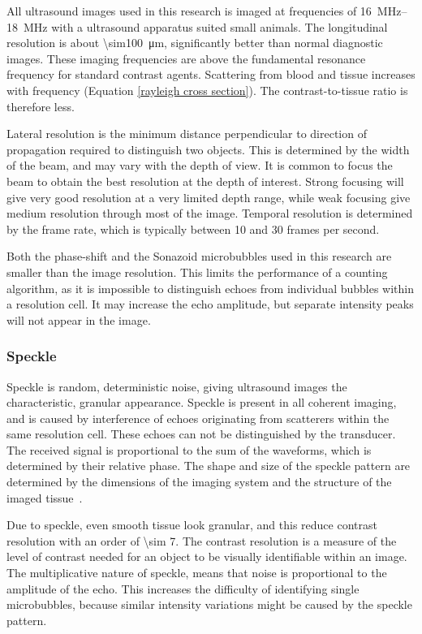 All ultrasound images used in this research is imaged at frequencies of \SIrange{16}{18}{\mega\hertz} with a ultrasound apparatus suited small animals. The longitudinal resolution is about \SI{\sim100}{\micro\meter}, significantly better than normal diagnostic images. These imaging frequencies are above the fundamental resonance frequency for standard contrast agents. Scattering from blood and tissue increases with frequency (Equation \eqref{rayleigh cross section}). The contrast-to-tissue ratio is therefore less. 

Lateral resolution is the minimum distance perpendicular to direction of propagation required to distinguish two objects. This is determined by the width of the beam, and may vary with the depth of view. It is common to focus the beam to obtain the best resolution at the depth of interest. Strong focusing will give very good resolution at a very limited depth range, while weak focusing give medium resolution through most of the image. Temporal resolution is determined by the frame rate, which is typically between 10 and 30 frames per second. 

Both the phase-shift and the Sonazoid\texttrademark{} microbubbles used in this research are smaller than the image resolution. This limits the performance of a counting algorithm, as it is impossible to distinguish echoes from individual bubbles within a resolution cell. It may increase the echo amplitude, but separate intensity peaks will not appear in the image.


\subsubsection{Speckle}
Speckle is random, deterministic noise, giving ultrasound images the characteristic, granular appearance. Speckle is present in all coherent imaging, and is caused by interference of echoes originating from scatterers within the same resolution cell. These echoes can not be distinguished by the transducer. The received signal is proportional to the sum of the waveforms, which is determined by their relative phase. The shape and size of the speckle pattern are determined by the dimensions of the imaging system and the structure of the imaged tissue~\cite{Szabo2013}.

Due to speckle, even smooth tissue look granular, and this reduce contrast resolution with an order of \num{\sim 7}. The contrast resolution is a measure of the level of contrast needed for an object to be visually identifiable within an image. The multiplicative nature of speckle, means that noise is proportional to the amplitude of the echo. This increases the difficulty of identifying single microbubbles, because similar intensity variations might be caused by the speckle pattern. 

